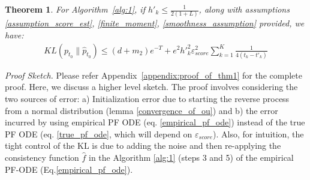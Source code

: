 \documentclass[11pt]{article}
\newcommand{\xh}[1]{\textcolor[HTML]{66CCFF}{#1}}
\newcommand{\KL}[2]{\mathrm{KL}\left(#1 \big\| #2\right)}
\newtheorem{theorem}[lemma]{Theorem}
\begin{document}

\begin{theorem}
\label{thm:smooth_score_case}
For  Algorithm~\ref{alg:1}, if $h'_k \leq \frac{1}{2(1+L)}$, along with assumptions \ref{assumption_score_est}, \ref{finite_moment}, \ref{smoothness_assumption}  provided, we have:
  \begin{align}
  \label{smooth_bound_complete_eq}
    KL(p_{t_0}\|\hat{p}_{t_0}) \leq (d+m_2) e^{-T} +  e^{2}{h'}_k^2 \varepsilon^2_{score} \sum_{k=1}^K\frac{1}{4(t_k-t'_k)}
\end{align}

\end{theorem}
\textit{Proof Sketch.}  Please refer Appendix~\ref{appendix:proof_of_thm1} for the complete proof. Here, we discuss a higher level sketch. The proof involves considering the two sources of error: a) Initialization error due to starting the reverse process from a normal distribution (lemma \ref{convergence_of_ou}) and b) the error incurred by using empirical PF ODE (eq. \ref{empirical_pf_ode}) instead of the true PF ODE (eq. \ref{true_pf_ode}, which will depend on $\varepsilon_{score}$). Also, for intuition, the tight control of the KL is due to adding the noise and then re-applying the consistency function $\hat{f}$ in the Algorithm \ref{alg:1} (steps 3 and 5) of the empirical PF-ODE (Eq.\ref{empirical_pf_ode}). 
    
\end{document}
